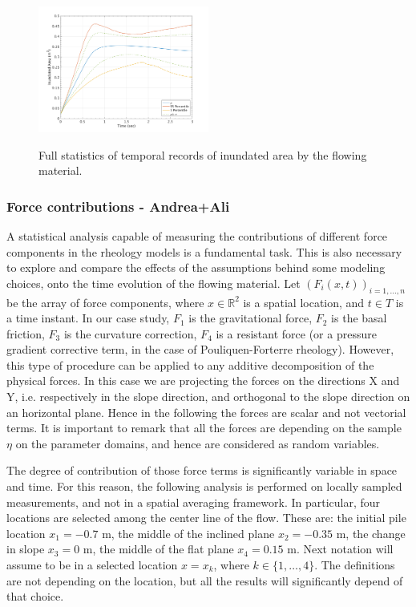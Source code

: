 \documentclass{article}
\begin{document}
\begin{figure}[H]
        \begin{minipage}[b]{1\linewidth}
                \centering
                \includegraphics[width=0.5\textwidth]{InclinedPlane/GlobalRecords/V_Global_Ar.png}
                \label{fig:Ramp-SP-InundAr-V}
        \end{minipage}
        \caption{Full statistics of temporal records of inundated area by the flowing material.}
        \label{fig:Ramp-SP-InundAr}
\end{figure}


\subsubsection{Force contributions - Andrea+Ali}
A statistical analysis capable of measuring the contributions of different force components in the rheology models is a fundamental task. This is also necessary to explore and compare the effects of the assumptions behind some modeling choices, onto the time evolution of the flowing material. Let $(F_i(x,t))_{i=1,\dots, n}$ be the array of force components, where $x\in\mathbb R^2$ is a spatial location, and $t\in T$ is a time instant. In our case study, $F_1$ is the gravitational force, $F_2$ is the basal friction, $F_3$ is the curvature correction, $F_4$ is a resistant force (or a pressure gradient corrective term, in the case of Pouliquen-Forterre rheology). However, this type of procedure can be applied to any additive decomposition of the physical forces. In this case we are projecting the forces on the directions X and Y, i.e. respectively in the slope direction, and orthogonal to the slope direction on an horizontal plane. Hence in the following the forces are scalar and not vectorial terms. It is important to remark that all the forces are depending on the sample $\eta$ on the parameter domains, and hence are considered as random variables.

The degree of contribution of those force terms is significantly variable in space and time. For this reason, the following analysis is performed on locally sampled measurements, and not in a spatial averaging framework. In particular, four locations are selected among the center line of the flow. These are: the initial pile location $x_1=-0.7$ m, the middle of the inclined plane $x_2=-0.35$ m, the change in slope $x_3=0$ m, the middle of the flat plane $x_4=0.15$ m. Next notation will assume to be in a selected location $x=x_k$, where $k\in\{1,\dots, 4\}$. The definitions are not depending on the location, but all the results will significantly depend of that choice.
\end{document}
